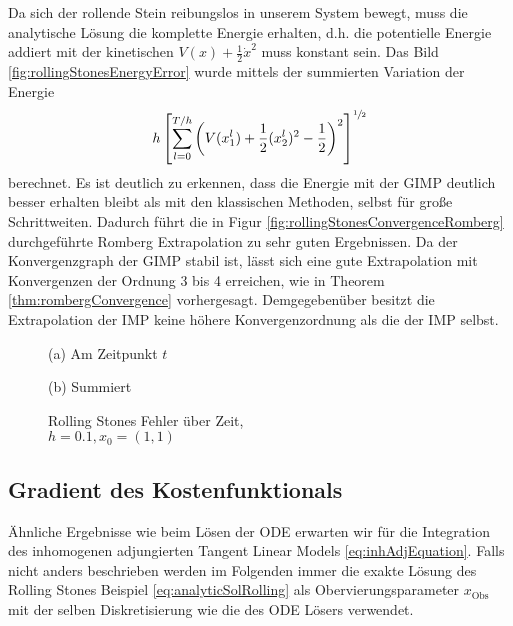 Da sich der rollende Stein reibungslos in unserem System bewegt, muss die analytische Lösung die komplette Energie erhalten, d.h. die potentielle Energie addiert mit der kinetischen $V(x) + \frac{1}{2}\dot x^2$ muss konstant sein. Das Bild \ref{fig:rollingStonesEnergyError} wurde mittels der summierten Variation der Energie 
\begin{equation}
 h \left[\sum_{l=0}^{T/h} \left( V(x_1^l) + \frac{1}{2} (x_2^l)^2 -\frac{1}{2}\right)^2\right]^{\sfrac{1}{2}}
 \label{eq:energyVariation}
\end{equation}
berechnet. Es ist deutlich zu erkennen, dass die Energie mit der GIMP deutlich besser erhalten bleibt als mit den klassischen Methoden, selbst für große Schrittweiten.
Dadurch führt die in Figur \ref{fig:rollingStonesConvergenceRomberg} durchgeführte Romberg Extrapolation zu sehr guten Ergebnissen. Da der Konvergenzgraph der GIMP stabil ist, lässt sich eine gute Extrapolation mit Konvergenzen der Ordnung 3 bis 4 erreichen, wie in Theorem \ref{thm:rombergConvergence} vorhergesagt. Demgegebenüber besitzt die Extrapolation der IMP keine höhere Konvergenzordnung als die der IMP selbst.
\begin{figure}[H]
\footnotesize 
\centering
\begin{minipage}[b]{0.49\linewidth}

\caption*{(a) Am Zeitpunkt $t$}\end{minipage}
\begin{minipage}[b]{0.49\linewidth}

\caption*{(b) Summiert}
\end{minipage}
\caption{Rolling Stones Fehler über Zeit, \\$h=0.1,x_0=(1,1)$}
\label{fig:rollingStonesEOT}

\end{figure}

\subsection{Gradient des Kostenfunktionals}
Ähnliche Ergebnisse wie beim Lösen der ODE erwarten wir für die Integration des inhomogenen adjungierten Tangent Linear Models \eqref{eq:inhAdjEquation}. Falls nicht anders beschrieben werden im Folgenden immer die exakte Lösung des Rolling Stones Beispiel \eqref{eq:analyticSolRolling} als Obervierungsparameter $x_{\text{Obs}}$ mit der selben Diskretisierung wie die des ODE Lösers verwendet.

